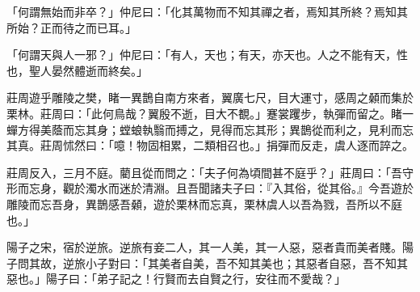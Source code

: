 \begin{pinyinscope}
「何謂無始而非卒？」仲尼曰：「化其萬物而不知其禪之者，焉知其所終？焉知其所始？正而待之而已耳。」

「何謂天與人一邪？」仲尼曰：「有人，天也；有天，亦天也。人之不能有天，性也，聖人晏然體逝而終矣。」

莊周遊乎雕陵之樊，睹一異鵲自南方來者，翼廣七尺，目大運寸，感周之顙而集於栗林。莊周曰：「此何鳥哉？翼殷不逝，目大不覩。」蹇裳躩步，執彈而留之。睹一蟬方得美蔭而忘其身；螳蜋執翳而搏之，見得而忘其形；異鵲從而利之，見利而忘其真。莊周怵然曰：「噫！物固相累，二類相召也。」捐彈而反走，虞人逐而誶之。

莊周反入，三月不庭。藺且從而問之：「夫子何為頃間甚不庭乎？」莊周曰：「吾守形而忘身，觀於濁水而迷於清淵。且吾聞諸夫子曰：『入其俗，從其俗。』今吾遊於雕陵而忘吾身，異鵲感吾顙，遊於栗林而忘真，栗林虞人以吾為戮，吾所以不庭也。」

陽子之宋，宿於逆旅。逆旅有妾二人，其一人美，其一人惡，惡者貴而美者賤。陽子問其故，逆旅小子對曰：「其美者自美，吾不知其美也；其惡者自惡，吾不知其惡也。」陽子曰：「弟子記之！行賢而去自賢之行，安往而不愛哉？」


\end{pinyinscope}